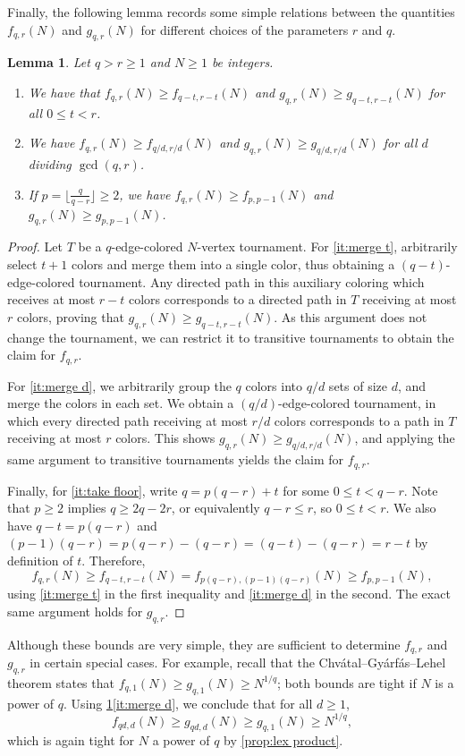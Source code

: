 \documentclass[11pt,reqno]{amsart}
\newtheorem{lemma}[theorem]{Lemma}
\theoremstyle{definition}
\newcommand{\flo}[1]{\lfloor #1 \rfloor}
\newcommand\1{\mathbf{1}}
\let\leq\leqslant
\let\geq\geqslant
\begin{document}
Finally,
the following lemma records some simple relations between the quantities $f_{q,r}(N)$ and $g_{q,r}(N)$ for different choices of the parameters $r$ and $q$. 
\begin{lemma}\label{lem:merge colors}
    Let $q >r \geq 1$ and $N\geq 1$ be integers.
    \begin{enumerate}[label=(\arabic*)]
        \item We have that $f_{q,r}(N) \geq f_{q-t, r-t}(N)$ and $g_{q,r}(N) \geq g_{q-t,r-t}(N)$ for all $0 \leq t<r$.\label{it:merge t}
        \item We have $f_{q,r}(N) \geq f_{q/d,r/d}(N)$ and $g_{q,r}(N) \geq g_{q/d,r/d}(N)$ for all $d$ dividing $\gcd(q,r)$. \label{it:merge d}
        \item If $p = \flo{\frac{q}{q-r}}\geq 2$, we have $f_{q,r}(N) \geq f_{p,p-1}(N)$ and $g_{q,r}(N) \geq g_{p,p-1}(N)$.\label{it:take floor}
    \end{enumerate}
\end{lemma}
\begin{proof}
    Let $T$ be a $q$-edge-colored $N$-vertex tournament. For \ref{it:merge t}, arbitrarily select $t+1$ colors and merge them into a single color, thus obtaining a $(q-t)$-edge-colored tournament. Any directed path in this auxiliary coloring which receives at most $r-t$ colors corresponds to a directed path in $T$ receiving at most $r$ colors, proving that $g_{q,r}(N) \geq g_{q-t,r-t}(N)$. As this argument does not change the tournament, we can restrict it to transitive tournaments to obtain the claim for $f_{q,r}$. 

    For \ref{it:merge d}, we arbitrarily group the $q$ colors into $q/d$ sets of size $d$, and merge the colors in each set. We obtain a $(q/d)$-edge-colored tournament, in which every directed path receiving at most $r/d$ colors corresponds to a path in $T$ receiving at most $r$ colors. This shows $g_{q,r}(N)\geq g_{q/d,r/d}(N)$, and applying the same argument to transitive tournaments yields the claim for $f_{q,r}$.

    Finally, for \ref{it:take floor}, write $q = p(q-r)+t$ for some $0 \leq t<q-r$. Note that $p \geq 2$ implies $q \geq 2q-2r$, or equivalently $q-r \leq r$, so $0\leq t< r$. We also have $q-t=p(q-r)$ and $(p-1)(q-r)=p(q-r)-(q-r)=(q-t)-(q-r)=r-t$ by definition of $t$. Therefore,
    \[
        f_{q,r}(N) \geq f_{q-t,r-t}(N) = f_{p(q-r),(p-1)(q-r)}(N)\geq f_{p,p-1}(N),
    \]
    using \ref{it:merge t} in the first inequality and \ref{it:merge d} in the second. The exact same argument holds for $g_{q,r}$.
\end{proof}
Although these bounds are very simple, they are sufficient to determine $f_{q,r}$ and $g_{q,r}$ in certain special cases. For example, recall that the Chv\'atal--Gy\'arf\'as--Lehel theorem states that $f_{q,1}(N) \geq g_{q,1}(N)\geq N^{1/q}$; both bounds are tight if $N$ is a power of $q$. Using \cref{lem:merge colors}\ref{it:merge d}, we conclude that for all $d \geq 1$,
\[
    f_{qd,d}(N) \geq g_{qd,d}(N)\geq g_{q,1}(N) \geq N^{1/q},
\]
which is again tight for $N$ a power of $q$ by \cref{prop:lex product}.
\end{document}
